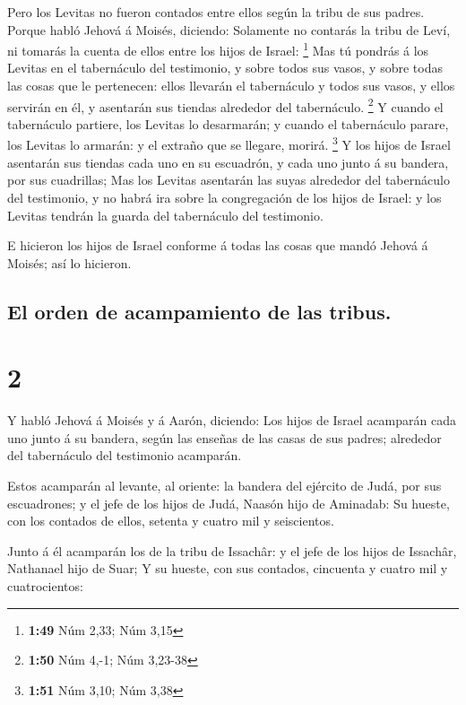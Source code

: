  Pero los Levitas no fueron contados entre ellos según la
tribu de sus padres.  Porque habló Jehová á Moisés,
diciendo:  Solamente no contarás la tribu de Leví, ni
tomarás la cuenta de ellos entre los hijos de Israel: \footnote{\textbf{1:49}
  Núm 2,33; Núm 3,15}  Mas tú pondrás á los Levitas en el
tabernáculo del testimonio, y sobre todos sus vasos, y sobre todas las
cosas que le pertenecen: ellos llevarán el tabernáculo y todos sus
vasos, y ellos servirán en él, y asentarán sus tiendas alrededor del
tabernáculo. \footnote{\textbf{1:50} Núm 4,-1; Núm 3,23-38}
 Y cuando el tabernáculo partiere, los Levitas lo
desarmarán; y cuando el tabernáculo parare, los Levitas lo armarán: y el
extraño que se llegare, morirá. \footnote{\textbf{1:51} Núm 3,10; Núm
  3,38}  Y los hijos de Israel asentarán sus tiendas cada
uno en su escuadrón, y cada uno junto á su bandera, por sus cuadrillas;
 Mas los Levitas asentarán las suyas alrededor del
tabernáculo del testimonio, y no habrá ira sobre la congregación de los
hijos de Israel: y los Levitas tendrán la guarda del tabernáculo del
testimonio.

 E hicieron los hijos de Israel conforme á todas las cosas
que mandó Jehová á Moisés; así lo hicieron.

\hypertarget{el-orden-de-acampamiento-de-las-tribus.}{%
\subsection{El orden de acampamiento de las
tribus.}\label{el-orden-de-acampamiento-de-las-tribus.}}

\hypertarget{section-1}{%
\section{2}\label{section-1}}

 Y habló Jehová á Moisés y á Aarón, diciendo: 
Los hijos de Israel acamparán cada uno junto á su bandera, según las
enseñas de las casas de sus padres; alrededor del tabernáculo del
testimonio acamparán.

 Estos acamparán al levante, al oriente: la bandera del
ejército de Judá, por sus escuadrones; y el jefe de los hijos de Judá,
Naasón hijo de Aminadab:  Su hueste, con los contados de
ellos, setenta y cuatro mil y seiscientos.

 Junto á él acamparán los de la tribu de Issachâr: y el jefe
de los hijos de Issachâr, Nathanael hijo de Suar;  Y su
hueste, con sus contados, cincuenta y cuatro mil y cuatrocientos:

